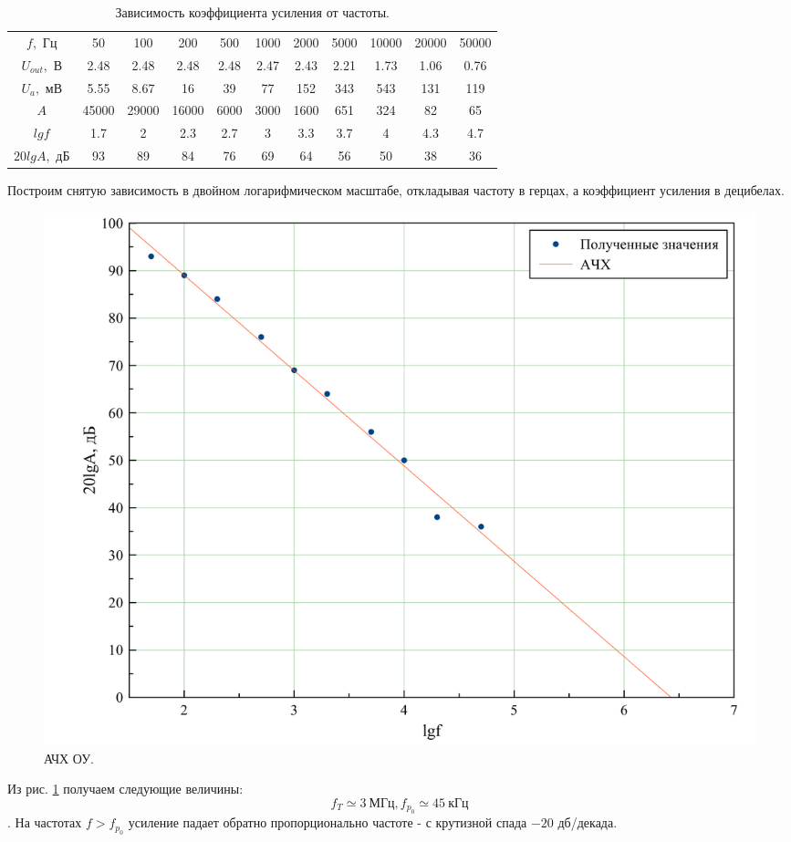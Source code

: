\documentclass[a4paper, 12pt, twoside]{article}
\begin{document}
\begin{table}[H]
	\centering
	\caption{Зависимость коэффициента усиления от частоты.}
	\label{kus}
	\begin{tabular}{c|c|c|c|c|c|c|c|c|c|c}
		\toprule
		$f,$ Гц      & 50    & 100   & 200   & 500  & 1000 & 2000 & 5000 & 10000 & 20000 & 50000 \\ 
		$U_{out},$ В & 2.48  & 2.48  & 2.48  & 2.48 & 2.47 & 2.43 & 2.21 & 1.73  & 1.06  & 0.76  \\ 
		$U_a,$ мВ    & 5.55  & 8.67  & 16    & 39   & 77   & 152  & 343  & 543   & 131   & 119   \\ 
		$A$          & 45000 & 29000 & 16000 & 6000 & 3000 & 1600 & 651  & 324   & 82    & 65    \\ \midrule
		$lgf$        & 1.7   & 2     & 2.3   & 2.7  & 3    & 3.3  & 3.7  & 4     & 4.3   & 4.7   \\ 
		$20lgA,$ дБ      & 93    & 89    & 84    & 76   & 69   & 64   & 56   & 50    & 38    & 36    \\ \bottomrule
	\end{tabular}
\end{table}

Построим снятую зависимость в двойном логарифмическом масштабе, откладывая частоту в герцах, а коэффициент усиления в децибелах.

\begin{figure}[H]
	\centering
	\includegraphics[width =  0.8\linewidth]{1}
	\caption{ АЧХ ОУ.}
	\label{ACHX}
\end{figure}

Из  рис. \ref{ACHX} получаем следующие величины:
$$f_T \simeq 3~ \text{МГц}, f_{p_0} \simeq 45~ \text{кГц} $$.
На частотах $f > f_{p_0}$ усиление падает обратно пропорционально частоте - с крутизной спада $-20$ дб/декада.
\end{document}
